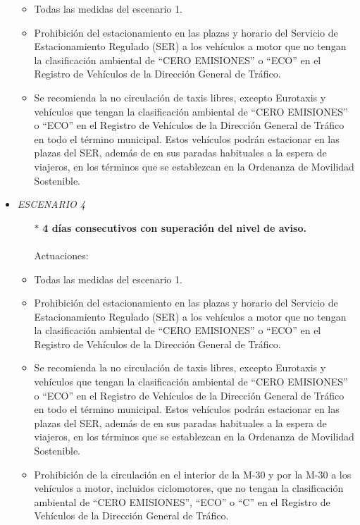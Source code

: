 \begin{itemize}
		\begin{itemize}
			\item Todas las medidas del escenario 1.
			\item Prohibición del estacionamiento en las plazas y horario del Servicio de Estacionamiento Regulado (SER) a los vehículos a motor que no tengan la clasificación ambiental de “CERO EMISIONES” o “ECO” en el Registro de Vehículos de la Dirección General de Tráfico. 		
			\item Se recomienda la no circulación de taxis libres, excepto Eurotaxis y vehículos que tengan la clasificación ambiental de “CERO EMISIONES” o “ECO” en el Registro de Vehículos de la Dirección General de Tráfico en todo el término municipal. Estos vehículos podrán estacionar en las plazas del SER, además de en sus paradas habituales a la espera de viajeros, en los términos que se establezcan en la Ordenanza de Movilidad Sostenible.
		\end{itemize}
	\item \textit{ESCENARIO 4}
		\begin{itemize}
			\item[$\ast$] \textbf{4 días consecutivos con superación del nivel de aviso. }
			\\ \\
			Actuaciones:
		\end{itemize}
		\begin{itemize}
			\item Todas las medidas del escenario 1.
			\item Prohibición del estacionamiento en las plazas y horario del Servicio de Estacionamiento Regulado (SER) a los vehículos a motor que no tengan la clasificación ambiental de “CERO EMISIONES” o “ECO” en el Registro de Vehículos de la Dirección General de Tráfico. 	
			\item Se recomienda la no circulación de taxis libres, excepto Eurotaxis y vehículos que tengan la clasificación ambiental de “CERO EMISIONES” o “ECO” en el Registro de Vehículos de la Dirección General de Tráfico en todo el término municipal. Estos vehículos podrán estacionar en las plazas del SER, además de en sus paradas habituales a la espera de viajeros, en los términos que se establezcan en la Ordenanza de Movilidad Sostenible.		
			\item Prohibición de la circulación en el interior de la M-30 y por la M-30 a los vehículos a motor, incluidos ciclomotores, que no tengan la clasificación ambiental de “CERO EMISIONES”, “ECO” o “C” en el Registro de Vehículos de la Dirección General de Tráfico. 
		\end{itemize}
\end{itemize}


